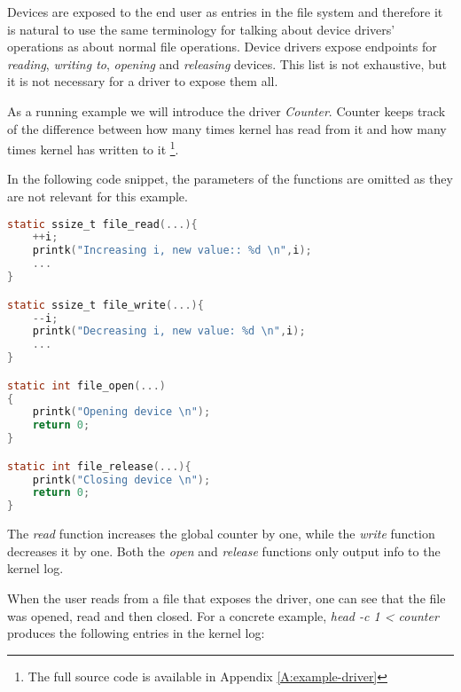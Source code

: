 \documentclass[..thesis.tex]{subfiles}
\begin{document}
Devices are exposed to the end user as entries in the file system and therefore it is natural to use the same terminology for talking about device drivers' operations as about normal file operations. Device drivers expose endpoints for \textit{reading}, \textit{writing to}, \textit{opening} and \textit{releasing} devices. This list is not exhaustive\cite[include/linux/fs.h]{torvalds_linux}, but it is not necessary for a driver to expose them all.

As a running example we will introduce the driver \textit{Counter}. Counter keeps track of the difference between how many times kernel has read from it and how many times kernel has written to it \footnote{The full source code is available in Appendix \ref{A:example-driver}}.

In the following code snippet, the parameters of the functions are omitted as they are not relevant for this example.



\begin{lstlisting}[language=C,style=def]
static ssize_t file_read(...){
    ++i;
    printk("Increasing i, new value:: %d \n",i);
    ...
}

static ssize_t file_write(...){
    --i;
    printk("Decreasing i, new value: %d \n",i);
    ...
}

static int file_open(...)
{
    printk("Opening device \n");
    return 0;
}

static int file_release(...){
    printk("Closing device \n");
    return 0;
}


\end{lstlisting}


The \textit{read} function increases the global counter by one, while the \textit{write} function decreases it by one. Both the \textit{open} and \textit{release} functions only output info to the kernel log.

When the user reads from a file that exposes the driver, one can see that the file was opened, read and then closed. For a concrete example,
\textit{head -c 1 < counter} produces the following entries in the kernel log:
\end{document}
